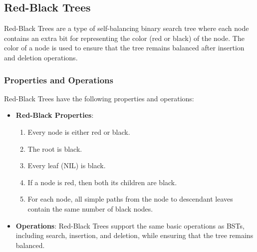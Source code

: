 \documentclass[12pt]{book} %
\begin{document}
\subsection{Red-Black Trees}
Red-Black Trees are a type of self-balancing binary search tree where each node contains an extra bit for representing the color (red or black) of the node. The color of a node is used to ensure that the tree remains balanced after insertion and deletion operations.

\subsubsection{Properties and Operations}
Red-Black Trees have the following properties and operations:
\begin{itemize}
    \item \textbf{Red-Black Properties}:
        \begin{enumerate}
            \item Every node is either red or black.
            \item The root is black.
            \item Every leaf (NIL) is black.
            \item If a node is red, then both its children are black.
            \item For each node, all simple paths from the node to descendant leaves contain the same number of black nodes.
        \end{enumerate}
    \item \textbf{Operations}: Red-Black Trees support the same basic operations as BSTs, including search, insertion, and deletion, while ensuring that the tree remains balanced.
\end{itemize}
\end{document}
